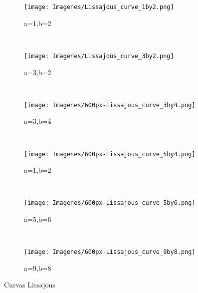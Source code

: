 \documentclass{article}
\begin{document}
\begin{figure}[ht!]
    \centering
    \begin{subfigure}[b]{0.3\textwidth}
        \texttt{[image: Imagenes/Lissajous\_curve\_1by2.png]}
        \caption{a=1,b=2}
        \label{fig:a1b2}
    \end{subfigure}
    ~ %
    \begin{subfigure}[b]{0.3\textwidth}
        \texttt{[image: Imagenes/Lissajous\_curve\_3by2.png]}
        \caption{a=3,b=2}
        \label{fig:a3b2}
    \end{subfigure}
    ~ %
    \begin{subfigure}[b]{0.3\textwidth}
        \texttt{[image: Imagenes/600px-Lissajous\_curve\_3by4.png]}
        \caption{a=3,b=4}
        \label{fig:a3b4}
    \end{subfigure}
    
    \\
    
    \begin{subfigure}[b]{0.3\textwidth}
        \texttt{[image: Imagenes/600px-Lissajous\_curve\_5by4.png]}
        \caption{a=1,b=2}
        \label{fig:a1b2}
    \end{subfigure}
    ~ %
    \begin{subfigure}[b]{0.3\textwidth}
        \texttt{[image: Imagenes/600px-Lissajous\_curve\_5by6.png]}
        \caption{a=5,b=6}
        \label{fig:a5b4}
    \end{subfigure}
    ~ %
    \begin{subfigure}[b]{0.3\textwidth}
        \texttt{[image: Imagenes/600px-Lissajous\_curve\_9by8.png]}
        \caption{a=9,b=8}
        \label{fig:a9b8}
    \end{subfigure}
    
    
    \caption{Curvas Lissajous\citep{CurvasLiss}}\label{fig:Lissajous}
\end{figure}
\end{document}
